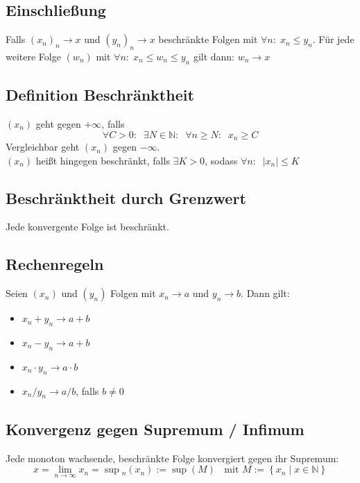 \documentclass[halfparscip]{scrartcl}
\newcounter{subsection2}
\begin{document}
\subsection{Einschließung}
Falls $(x_n)_n \rightarrow x$ und $(y_n)_n \rightarrow x$ beschränkte Folgen mit $\forall n: \; x_n \leq y_n$. 
Für jede weitere Folge $(w_n)$ mit $\forall n: \; x_n \leq w_n \leq y_n$ gilt dann: $w_n \rightarrow x$

\subsection{Definition Beschränktheit}
$(x_n)$ geht gegen $+\infty$, falls 
\begin{equation*}
	\forall C > 0: \;\; \exists N \in \mathbb{N}: \;\; \forall n \geq N: \;\; x_n \geq C
\end{equation*}
Vergleichbar geht $(x_n)$ gegen $-\infty$. \\
$(x_n)$ heißt hingegen beschränkt, falls $\exists K > 0$, sodass $\forall n : \;\; \vert x_n \vert \leq K$

\subsection{Beschränktheit durch Grenzwert}
Jede konvergente Folge ist beschränkt.

\subsection{Rechenregeln}
Seien $(x_n)$ und $(y_n)$ Folgen mit $x_n \rightarrow a$ und $y_n \rightarrow b$. Dann gilt:
\begin{itemize}
	\item $x_n + y_n \rightarrow a + b$
	\item $x_n - y_n \rightarrow a + b$
	\item $x_n \cdot y_n \rightarrow a \cdot b$
	\item $x_n / y_n \rightarrow a / b$, falls $b \neq 0$
\end{itemize}

\subsection{Konvergenz gegen Supremum / Infimum}
Jede monoton wachsende, beschränkte Folge konvergiert gegen ihr Supremum:
\begin{equation*}
	x = \lim_{n \rightarrow \infty} x_n = \sup\hspace{0cm}_n(x_n) := \sup(M) \;\; \text{ mit } M := \left\{x_n \;\vert\; x \in \mathbb{N}\right\}
\end{equation*}
\end{document}
